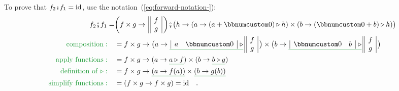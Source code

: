 To prove that $f_{2}\bef f_{1}=\text{id}$, use the notation~(\ref{eq:forward-notation-}):
\begin{align*}
f_{2}\bef f_{1}= & \bigg(f\times g\rightarrow\,\begin{array}{||c|}
f\\
g
\end{array}\,\bigg)\bef\big(h\rightarrow(a\rightarrow(a+\bbnum 0)\triangleright h)\times(b\rightarrow(\bbnum 0+b)\triangleright h)\big)\\
{\color{greenunder}\text{composition}:}\quad & =f\times g\rightarrow\big(a\rightarrow\gunderline{\,\begin{array}{|cc|}
a & \bbnum 0\end{array}\,\,\triangleright}\,\begin{array}{||c|}
f\\
g
\end{array}\,\big)\times\big(b\rightarrow\gunderline{\,\begin{array}{|cc|}
\bbnum 0 & b\end{array}\,\,\triangleright}\,\begin{array}{||c|}
f\\
g
\end{array}\,\big)\\
{\color{greenunder}\text{apply functions}:}\quad & =f\times g\rightarrow(a\rightarrow\gunderline{a\triangleright f})\times(b\rightarrow\gunderline{b\triangleright g})\\
{\color{greenunder}\text{definition of }\triangleright:}\quad & =f\times g\rightarrow\gunderline{\left(a\rightarrow f(a)\right)}\times\gunderline{\left(b\rightarrow g(b)\right)}\\
{\color{greenunder}\text{simplify functions}:}\quad & =\left(f\times g\rightarrow f\times g\right)=\text{id}\quad.
\end{align*}

